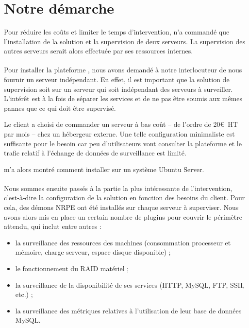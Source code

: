 \section{Notre démarche}

\paragraph{}
Pour réduire les coûts et limiter le temps d'intervention, \adacast{} n'a commandé que l'installation de la solution \acentreon{} et la supervision de deux serveurs.
La supervision des autres serveurs serait alors effectuée par ses ressources internes.

\paragraph{}
Pour installer la plateforme \acentreon{}, nous avons demandé à notre interlocuteur de nous fournir un serveur indépendant.
En effet, il est important que la solution de supervision soit sur un serveur qui soit indépendant des serveurs à surveiller.
L'intérêt est à la fois de séparer les services et de ne pas être soumis aux mêmes pannes que ce qui doit être supervisé.

Le client a choisi de commander un serveur à bas coût -- de l'ordre de 20\euro~HT par mois -- chez un hébergeur externe.
Une telle configuration minimaliste est suffisante pour le besoin car peu d'utilisateurs vont consulter la plateforme \acentreon{} et le trafic relatif à l'échange de données de surveillance est limité.

\asegir{} m'a alors montré comment installer \acentreon{} sur un système \alinux{} Ubuntu Server.

\paragraph{}
Nous sommes ensuite passés à la partie la plus intéressante de l'intervention, c'est-à-dire la configuration de la solution en fonction des besoins du client.
Pour cela, des démons NRPE ont été installés sur chaque serveur à superviser.
Nous avons alors mis en place un certain nombre de plugins pour couvrir le périmètre attendu, qui inclut entre autres :

\begin{itemize}
	\item la surveillance des ressources des machines (consommation processeur et mémoire, charge serveur, espace disque disponible) ;
	\item le fonctionnement du RAID matériel ;
	\item la surveillance de la disponibilité de ses services (HTTP, MySQL, FTP, SSH, etc.) ;
	\item la surveillance des métriques relatives à l'utilisation de leur base de données MySQL.
\end{itemize}

